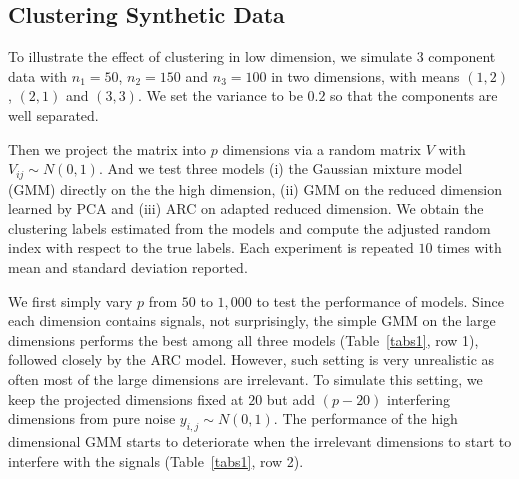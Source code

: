 \documentclass[12pt]{article}
\begin{document}
\subsection{Clustering Synthetic Data}

To illustrate the effect of clustering in low dimension, we simulate $3$ component data with $n_1=50$, $n_2=150$ and $n_3=100$ in two dimensions, with means $(1,2)$, $(2,1)$ and $(3,3)$. We set the variance to be $0.2$ so that the components are well separated.

Then we project the matrix into $p$ dimensions via a random matrix $V$ with $V_{ij}\sim N(0,1)$. And we test three models (i) the Gaussian mixture model (GMM) directly on the the high dimension, (ii) GMM on the reduced dimension learned by PCA and (iii) ARC on adapted reduced dimension. We obtain the clustering labels estimated from the models and compute the  adjusted random index with respect to the true labels. Each experiment is repeated $10$ times with mean and standard deviation reported.

We first simply vary $p$ from $50$ to $1,000$ to test the performance of models. Since each dimension contains signals, not surprisingly, the simple GMM on the large dimensions performs the best among all three models (Table~\ref{tabs1}, row 1), followed closely by the ARC model. However, such setting is very unrealistic as often most of the large dimensions are irrelevant. To simulate this setting, we keep the projected dimensions fixed at $20$ but add $(p-20)$ interfering dimensions from pure noise $y_{i,j}\sim N(0,1)$. The performance of the high dimensional GMM starts to deteriorate when the irrelevant dimensions to start to interfere with the signals (Table~\ref{tabs1}, row 2).
\end{document}
